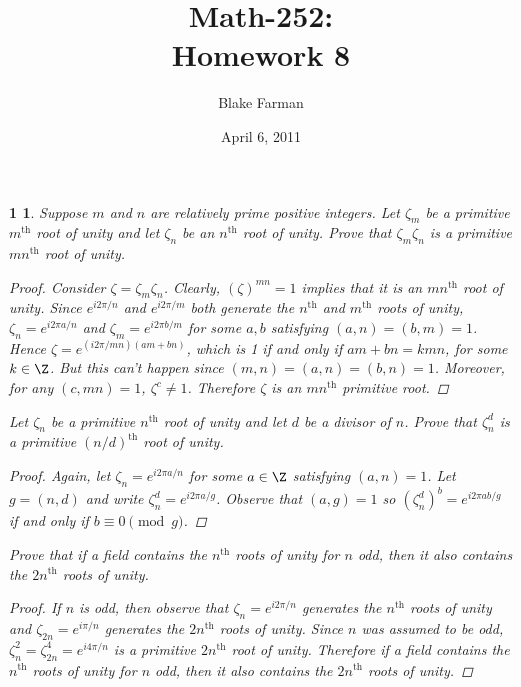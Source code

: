 \documentclass[10pt]{amsart}
\author{Blake Farman}
\title{Math-252:\\Homework 8}
\date{April 6, 2011}
\begin{document}
\maketitle

\newtheorem*{thm}{1}

\begin{thm}{}
  \label{Ex1}
  Suppose $m$ and $n$ are relatively prime positive integers.
  Let $\zeta_m$ be a primitive $m^{\text{th}}$ root of unity and let $\zeta_n$ be an $n^{\text{th}}$ root of unity.
  Prove that $\zeta_m\zeta_n$ is a primitive $mn^{\text{th}}$ root of unity.

  \begin{proof}
    Consider $\zeta = \zeta_m\zeta_n$.  
    Clearly, $(\zeta)^{mn} = 1$ implies that it is an $mn^{\text{th}}$ root of unity.
    Since $e^{i2\pi/n}$ and $e^{i2\pi/m}$ both generate the $n^{\text{th}}$ and $m^{\text{th}}$ roots of unity, $\zeta_n = e^{i2\pi a/n}$ and $\zeta_m = e^{i2\pi b/m}$ for some $a,b$ satisfying $(a,n) = (b,m) = 1$.
    Hence $\zeta = e^{(i2\pi/mn)(am+bn)}$, which is 1 if and only if $am + bn = kmn$, for some $k \in \Z$.
    But this can't happen since $(m,n) = (a,n) = (b,n) = 1$.
    Moreover, for any $(c,mn) = 1$, $\zeta^c \not = 1$.
    Therefore $\zeta$ is an $mn^{\text{th}}$ primitive root.
  \end{proof}

  Let $\zeta_n$ be a primitive $n^{\text{th}}$ root of unity and let $d$ be a divisor of $n$.
  Prove that $\zeta_n^d$ is a primitive $(n/d)^{\text{th}}$ root of unity.
  
  \begin{proof}
    Again, let $\zeta_n = e^{i2\pi a/n}$ for some $a \in \Z$ satisfying $(a,n) = 1$.
    Let $g = (n,d)$ and write $\zeta_n^d = e^{i2\pi a/g}$.
    Observe that $(a,g) = 1$ so $(\zeta_n^d)^b = e^{i2\pi ab/g}$ if and only if $b \equiv 0 \pmod{g}$.
  \end{proof}
  
  Prove that if a field contains the $n^{\text{th}}$ roots of unity for $n$ odd, then it also contains the $2n^{\text{th}}$ roots of unity.
  
  \begin{proof}
    If $n$ is odd, then observe that $\zeta_n = e^{i2\pi/n}$ generates the $n^{\text{th}}$ roots of unity and $\zeta_{2n} = e^{i\pi/n}$ generates the $2n^{\text{th}}$ roots of unity.
    Since $n$ was assumed to be odd, $\zeta_n^2 = \zeta_{2n}^4 = e^{i4\pi/n}$ is a primitive $2n^{\text{th}}$ root of unity.
    Therefore if a field contains the $n^{\text{th}}$ roots of unity for $n$ odd, then it also contains the $2n^{\text{th}}$ roots of unity.
  \end{proof}
\end{thm}
\end{document}
